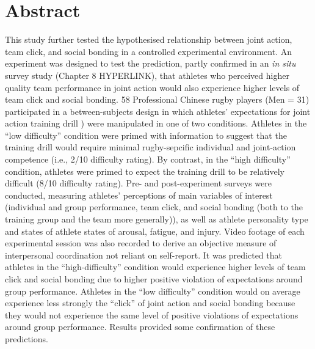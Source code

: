 \documentclass[english]{article}\usepackage[]{graphicx}\usepackage[]{color}
\begin{document}

\section{Abstract}
This study further tested the hypothesised relationship between joint action, team click, and social bonding in a controlled experimental environment.  An experiment was designed to test the prediction, partly confirmed in an \textit{in situ} survey study (Chapter 8 HYPERLINK), that athletes who perceived higher quality team performance in joint action would also experience higher levels of team click and social bonding.  58 Professional Chinese rugby players (Men = 31) participated in a between-subjects design in which athletes' expectations for joint action training drill \citep[``Invasion drill''][]{Passos2011}) were manipulated in one of two conditions.  Athletes in the ``low difficulty'' condition were primed with information to suggest that the training drill would require minimal rugby-sepcific individual and joint-action competence (i.e., 2/10 difficulty rating).  By contrast, in the ``high difficulty'' condition, athletes were primed to expect the training drill to be relatively difficult (8/10 difficulty rating). Pre- and post-experiment surveys were conducted, measuring athletes' perceptions of main variables of interest (individual and group performance, team click, and social bonding (both to the training group and the team more generally)), as well as athlete personality type and states of athlete states of arousal, fatigue, and injury.  Video footage of each experimental session was also recorded to derive an objective measure of interpersonal coordination not reliant on self-report. It was predicted that athletes in the ``high-difficulty'' condition would experience higher levels of team click and social bonding due to higher positive violation of expectations around group performance.  Athletes in the ``low difficulty'' condition would on average experience less strongly the ``click'' of joint action and social bonding because they would not experience the same level of positive violations of expectations around group performance.  Results provided some confirmation of these predictions.
\end{document}

